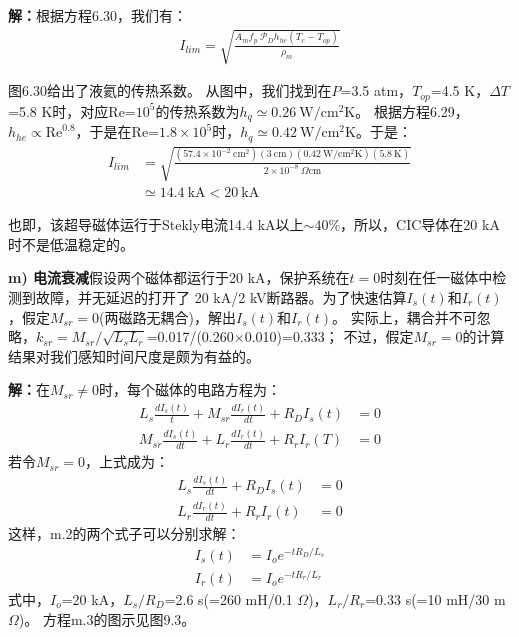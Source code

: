 \textbf{解：}根据方程6.30，我们有：
\begin{align*}%
I_{lim}=\sqrt{\frac{A_mf_p\ \mathcal{P}_Dh_{he}(T_c-T_{op})}{\rho_m}}\tag{6.30}
\end{align*}

图6.30给出了液氦的传热系数。
从图中，我们找到在$P$=3.5 atm，$T_{op}$=4.5 K，$\Delta T$=5.8 K时，对应Re=$10^5$的传热系数为$h_q\simeq 0.26\ \mathrm{W/cm^2 K}$。
根据方程6.29，$h_{he}\propto \mathrm{Re}^{0.8}$，于是在Re=$1.8\times 10^5$时，$h_q\simeq 0.42\ \mathrm{W/cm^2 K}$。于是：
\begin{align*}%
I_{lim}&=\sqrt{\frac{(57.4\times 10^{-2}\ \mathrm{cm^2})(3\ \mathrm{cm})(0.42\ \mathrm{W/cm^2K})(5.8\ \mathrm{K})}{2\times 10^{-8}\ \Omega\mathrm{cm}}}\\
&\simeq 14.4\ \mathrm{kA}<20\ \mathrm{kA}
\end{align*}

也即，该超导磁体运行于Stekly电流14.4 kA以上$\sim 40\%$，所以，CIC导体在20 kA时不是低温稳定的。

\textbf{m) 电流衰减}\qquad 假设两个磁体都运行于20 kA，保护系统在$t=0$时刻在任一磁体中检测到故障，并无延迟的打开了
20 kA/2 kV断路器。为了快速估算$I_s(t)$和$I_r(t)$，假定$M_{sr}=0$(两磁路无耦合)，解出$I_s(t)$和$I_r(t)$。
实际上，耦合并不可忽略，$k_{sr}=M_{sr}/\sqrt{L_sL_r}$=0.017/(0.260$\times$0.010)=0.333；
不过，假定$M_{sr}=0$的计算结果对我们感知时间尺度是颇为有益的。

\textbf{解：}在$M_{sr}\ne 0$时，每个磁体的电路方程为：
\begin{align*}%
L_s\frac{dI_s(t)}{t}+M_{sr}\frac{dI_r(t)}{dt}+R_DI_s(t)&=0\\
M_{sr}\frac{dI_s(t)}{dt}+L_r\frac{dI_r(t)}{dt}+R_rI_r(T)&=0 \tag{m.1}
\end{align*}
若令$M_{sr}=0$，上式成为：
\begin{align*}%
L_s\frac{dI_s(t)}{dt}+R_DI_s(t)&=0\\
L_r\frac{dI_r(t)}{dt}+R_rI_r(t)&=0\tag{m.2}
\end{align*}
这样，m.2的两个式子可以分别求解：
\begin{align*}%
I_s(t)&=I_oe^{-tR_D/L_s}\\
I_r(t)&=I_oe^{-tR_r/L_r} \tag{m.3}
\end{align*}
式中，$I_o$=20 kA，$L_s/R_D$=2.6 s(=260 mH/0.1 $\Omega$)，$L_r/R_r$=0.33 s(=10 mH/30 m$\Omega$)。
方程m.3的图示见图9.3。

